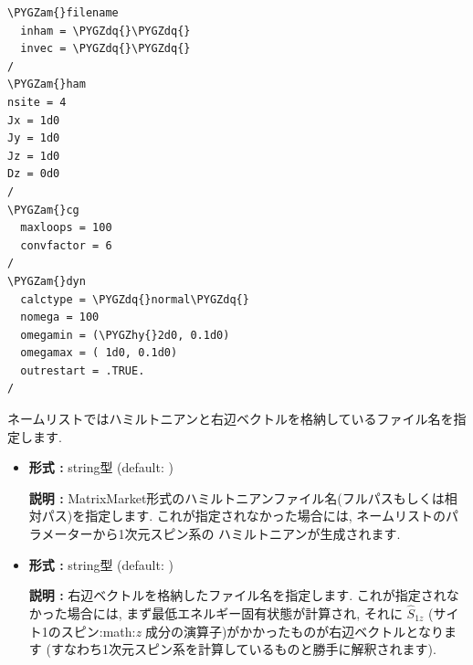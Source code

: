 \documentclass[letterpaper,10pt,dvipdfmx,openany]{sphinxmanual}
\def\PYGZam{\char`\&}
\def\PYGZhy{\char`\-}
\def\PYGZdq{\char`\"}
\begin{document}
\begin{Verbatim}[commandchars=\\\{\}]
\PYGZam{}filename
  inham = \PYGZdq{}\PYGZdq{}
  invec = \PYGZdq{}\PYGZdq{}
/
\PYGZam{}ham
nsite = 4
Jx = 1d0
Jy = 1d0
Jz = 1d0
Dz = 0d0
/
\PYGZam{}cg
  maxloops = 100
  convfactor = 6
/
\PYGZam{}dyn
  calctype = \PYGZdq{}normal\PYGZdq{}
  nomega = 100
  omegamin = (\PYGZhy{}2d0, 0.1d0)
  omegamax = ( 1d0, 0.1d0)
  outrestart = .TRUE.
/
\end{Verbatim}

 ネームリストではハミルトニアンと右辺ベクトルを格納しているファイル名を指定します.
\begin{itemize}
\item {} 

\textbf{形式 :} string型 (default: )

\textbf{説明 :}
MatrixMarket形式のハミルトニアンファイル名(フルパスもしくは相対パス)を指定します.
これが指定されなかった場合には,
 ネームリストのパラメーターから1次元スピン系の
ハミルトニアンが生成されます.

\item {} 

\textbf{形式 :} string型 (default: )

\textbf{説明 :} 右辺ベクトルを格納したファイル名を指定します.
これが指定されなかった場合には, まず最低エネルギー固有状態が計算され,
それに \({\hat S}_{1 z}\) (サイト1のスピン:math:\emph{z} 成分の演算子)がかかったものが右辺ベクトルとなります
(すなわち1次元スピン系を計算しているものと勝手に解釈されます).

\end{itemize}
\end{document}

